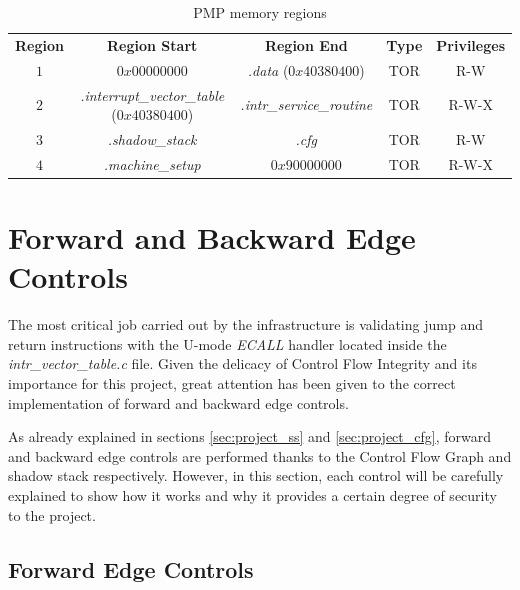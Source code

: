 \begin{table}
  \centering
  \begin{tabular}{|c|c|c|c|c|}
    \hline
    \textbf{Region}    & \textbf{Region Start}                             & \textbf{Region End}              & \textbf{Type} & \textbf{Privileges} \\
    \hhline{=====} $1$ & $0x00000000$                                      & \textit{.data} ($0x40380400$)    & TOR           & R-W                 \\
    \hline
    $2$                & \textit{.interrupt\_vector\_table} ($0x40380400$) & \textit{.intr\_service\_routine} & TOR           & R-W-X               \\
    \hline
    $3$                & \textit{.shadow\_stack}                           & \textit{.cfg}                    & TOR           & R-W                 \\
    \hline
    $4$                & \textit{.machine\_setup}                          & $0x90000000$                     & TOR           & R-W-X               \\
    \hline
  \end{tabular}
  \caption{PMP memory regions}
  \label{tab:pmpregions}
\end{table}

\section{Forward and Backward Edge Controls}
\label{sec:project_controls}

The most critical job carried out by the infrastructure is validating jump and return
instructions with the U-mode \textit{ECALL} handler located inside the \textit{intr\_vector\_table.c}
file. Given the delicacy of Control Flow Integrity and its importance for this
project, great attention has been given to the correct implementation of forward
and backward edge controls.

As already explained in sections \ref{sec:project_ss} and \ref{sec:project_cfg},
forward and backward edge controls are performed thanks to the Control Flow
Graph and shadow stack respectively. However, in this section, each control will
be carefully explained to show how it works and why it provides a certain degree
of security to the project.

\subsection{Forward Edge Controls}
\label{subsec:forward}

